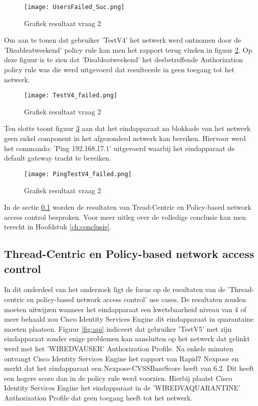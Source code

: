 \begin{figure}[H]
	\centering
	\texttt{[image: UsersFailed\_Suc.png]}
	\caption{Grafiek resultaat vraag 2}
	\label{fig:failed}
\end{figure}

Om aan te tonen dat gebruiker 'TestV4' het netwerk werd ontnomen door de 'Disable\textunderscore at\textunderscore weekend' policy rule kan men het rapport terug vinden in figuur \ref{fig:failed2}. Op deze figuur is te zien dat 'Disable\textunderscore at\textunderscore weekend' het desbetreffende Authorization policy rule was die werd uitgevoerd dat resulteerde in geen toegang tot het netwerk. 

\begin{figure}[H]
	\centering
	\texttt{[image: TestV4\_failed.png]}
	\caption{Grafiek resultaat vraag 2}
	\label{fig:failed2}
\end{figure}

Ten slotte toont figuur \ref{fig:ping} aan dat het eindapparaat na blokkade van het netwerk geen enkel component in het afgezonderd netwerk kan bereiken. Hiervoor werd het commando: 'Ping 192.168.17.1' uitgevoerd waarbij het eindapparaat de default gateway tracht te bereiken.

\begin{figure}[H]
	\centering
	\texttt{[image: PingTestV4\_failed.png]}
	\caption{Grafiek resultaat vraag 2}
	\label{fig:ping}
\end{figure}

In de sectie \ref{sec:trepo} worden de resultaten van Tread-Centric en Policy-based network access control besproken. Voor meer uitleg over de volledige conclusie kan men terecht in Hoofdstuk \ref{ch:conclusie}.


\subsection{Thread-Centric en Policy-based network access control}
\label{sec:trepo}
In dit onderdeel van het onderzoek ligt de focus op de resultaten van de 'Thread-centric en policy-based network access control' use cases. De resultaten zouden moeten uitwijzen wanneer het eindapparaat een kwetsbaarheid niveau van 4 of meer behaald zou Cisco Identity Services Engine dit eindapparaat in quarantaine moeten plaatsen.
\newline
\newline
Figuur \ref{fig:api} indiceert dat gebruiker 'TestV5' met zijn eindapparaat zonder enige problemen kan aansluiten op het netwerk dat gelinkt werd met het 'WIRED\textunderscore VA\textunderscore USER' Authorization Profile. Na enkele minuten ontvangt Cisco Identity Services Engine het rapport van Rapid7 Nexpose en merkt dat het eindapparaat een Nexpose-CVSS\textunderscore Base\textunderscore Score heeft van 6.2. Dit heeft een hogere score dan in de policy rule werd voorzien. Hierbij plaatst Cisco Identity Services Engine het eindapparaat in de 'WIRED\textunderscore VA\textunderscore QUARANTINE' Authorization Profile dat geen toegang heeft tot het netwerk. 

